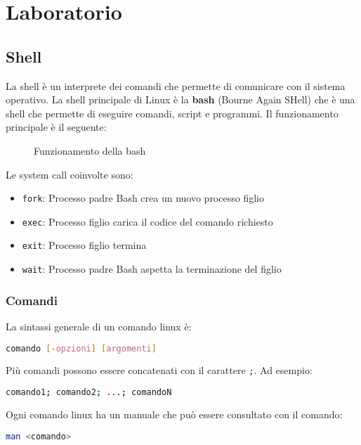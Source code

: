 \documentclass[a4paper]{article}
\begin{document}


\tableofcontents
\pagebreak

\section{Laboratorio}
\subsection{Shell}
La shell è un interprete dei comandi che permette di comunicare con il sistema operativo.
La shell principale di Linux è la \textbf{bash} (Bourne Again SHell) che è una shell
che permette di eseguire comandi, script e programmi. Il funzionamento principale è il
seguente:
\begin{figure}[H]
  \centering
  \caption{Funzionamento della bash}
\end{figure}
\noindent
Le system call coinvolte sono:
\begin{itemize}
  \item \texttt{fork}: Processo padre Bash crea un nuovo processo figlio
  \item \texttt{exec}: Processo figlio carica il codice del comando richiesto
  \item \texttt{exit}: Processo figlio termina
  \item \texttt{wait}: Processo padre Bash aspetta la terminazione del figlio
\end{itemize}

\subsubsection{Comandi}
La sintassi generale di un comando linux è:
\begin{lstlisting}[language=bash]
comando [-opzioni] [argomenti]
\end{lstlisting}
Più comandi possono essere concatenati con il carattere \texttt{;}. Ad esempio:
\begin{lstlisting}[language=bash]
comando1; comando2; ...; comandoN
\end{lstlisting}
Ogni comando linux ha un  manuale che può essere consultato con il comando:
\begin{lstlisting}[language=bash]
man <comando>
\end{lstlisting}
\end{document}
